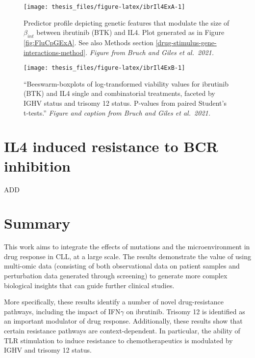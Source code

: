 \documentclass[11pt, a4paper, twosided]{book}
\begin{document}
\begin{figure}

{\centering \texttt{[image: thesis\_files/figure-latex/ibrIl4ExA-1]} 

}

\caption{Predictor profile depicting genetic features that modulate the size of \(\beta_{int}\) between ibrutinib (BTK) and IL4. Plot generated as in Figure \ref{fig:FluCpGExA}. See also Methods section \ref{drug-stimulus-gene-interactions-method}. \emph{Figure from Bruch and Giles et al.~2021.}}\label{fig:ibrIl4ExA}
\end{figure}
\begin{figure}

{\centering \texttt{[image: thesis\_files/figure-latex/ibrIl4ExB-1]} 

}

\caption{``Beeswarm-boxplots of log-transformed viability values for ibrutinib (BTK) and IL4 single and combinatorial treatments, faceted by IGHV status and trisomy 12 status. P-values from paired Student's t-tests.'' \emph{Figure and caption from Bruch and Giles et al.~2021.}}\label{fig:ibrIl4ExB}
\end{figure}
\hypertarget{il4-ibrutinib}{%
\section{IL4 induced resistance to BCR inhibition}\label{il4-ibrutinib}}

ADD

\hypertarget{summary-2}{%
\section{Summary}\label{summary-2}}

This work aims to integrate the effects of mutations and the microenvironment in drug response in CLL, at a large scale. The results demonstrate the value of using multi-omic data (consisting of both observational data on patient samples and perturbation data generated through screening) to generate more complex biological insights that can guide further clinical studies.

More specifically, these results identify a number of novel drug-resistance pathways, including the impact of IFN\(\gamma\) on ibrutinib. Trisomy 12 is identified as an important modulator of drug response. Additionally, these results show that certain resistance pathways are context-dependent. In particular, the ability of TLR stimulation to induce resistance to chemotherapeutics is modulated by IGHV and trisomy 12 status.
\end{document}
